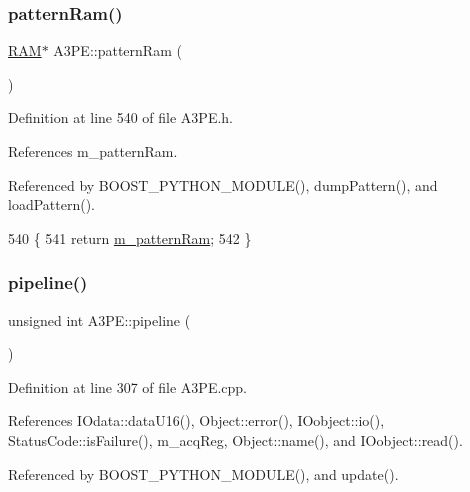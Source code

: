\subsubsection{\texorpdfstring{pattern\+Ram()}{patternRam()}}
{\footnotesize\ttfamily \hyperlink{classRAM}{R\+AM}$\ast$ A3\+P\+E\+::pattern\+Ram (\begin{DoxyParamCaption}{ }\end{DoxyParamCaption})\hspace{0.3cm}{\ttfamily [inline]}}



Definition at line 540 of file A3\+P\+E.\+h.



References m\+\_\+pattern\+Ram.



Referenced by B\+O\+O\+S\+T\+\_\+\+P\+Y\+T\+H\+O\+N\+\_\+\+M\+O\+D\+U\+L\+E(), dump\+Pattern(), and load\+Pattern().


\begin{DoxyCode}
540                    \{
541     \textcolor{keywordflow}{return} \hyperlink{classA3PE_a84d5deabbbf2d513144dd6a00390182e}{m\_patternRam};
542   \}
\end{DoxyCode}
\mbox{\label{classA3PE_aeb22b2fcba4d14f234ad2d6dcef7948c}} 
\subsubsection{\texorpdfstring{pipeline()}{pipeline()}}
{\footnotesize\ttfamily unsigned int A3\+P\+E\+::pipeline (\begin{DoxyParamCaption}{ }\end{DoxyParamCaption})}



Definition at line 307 of file A3\+P\+E.\+cpp.



References I\+Odata\+::data\+U16(), Object\+::error(), I\+Oobject\+::io(), Status\+Code\+::is\+Failure(), m\+\_\+acq\+Reg, Object\+::name(), and I\+Oobject\+::read().



Referenced by B\+O\+O\+S\+T\+\_\+\+P\+Y\+T\+H\+O\+N\+\_\+\+M\+O\+D\+U\+L\+E(), and update().


